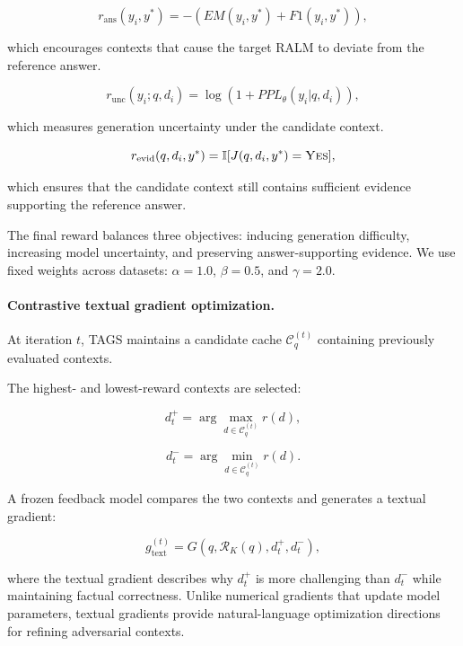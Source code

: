 \documentclass[11pt]{article}
\begin{document}
\begin{equation}
r_{\mathrm{ans}}(y_i,y^*)
=
-\left(
EM(y_i,y^*)+F1(y_i,y^*)
\right),
\end{equation}

which encourages contexts that cause the target RALM to deviate from the reference answer.


\begin{equation}
r_{\mathrm{unc}}(y_i;q,d_i)
=
\log
(1+PPL_{\theta}(y_i|q,d_i)),
\end{equation}

which measures generation uncertainty under the candidate context.


\begin{equation}
r_{\mathrm{evid}}(q,d_i,y^*)
=
\mathbb{I}
[J(q,d_i,y^*)=\textsc{Yes}],
\end{equation}

which ensures that the candidate context still contains sufficient evidence supporting the reference answer.

The final reward balances three objectives:
inducing generation difficulty, increasing model uncertainty, and preserving answer-supporting evidence.
We use fixed weights across datasets:
$\alpha=1.0$, $\beta=0.5$, and $\gamma=2.0$.


\paragraph{Contrastive textual gradient optimization.}

At iteration $t$, TAGS maintains a candidate cache $\mathcal{C}^{(t)}_q$ containing previously evaluated contexts.

The highest- and lowest-reward contexts are selected:

\begin{equation}
d_t^+
=
\arg\max_{d\in\mathcal{C}^{(t)}_q}r(d),
\end{equation}


\begin{equation}
d_t^-
=
\arg\min_{d\in\mathcal{C}^{(t)}_q}r(d).
\end{equation}


A frozen feedback model compares the two contexts and generates a textual gradient:

\begin{equation}
g_{\mathrm{text}}^{(t)}
=
G(q,\mathcal{R}_{K}(q),d_t^+,d_t^-),
\end{equation}

where the textual gradient describes why $d_t^+$ is more challenging than $d_t^-$ while maintaining factual correctness. Unlike numerical gradients that update model parameters, textual gradients provide natural-language optimization directions for refining adversarial contexts.
\end{document}
